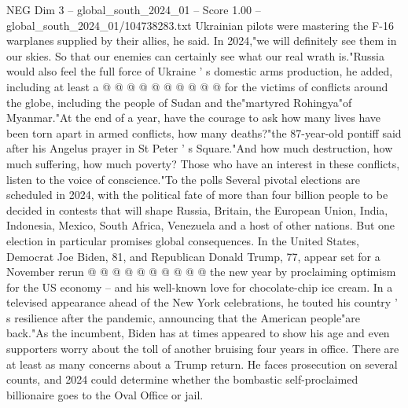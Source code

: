 \begin{textsample}{NEG Dim 3 – global\_south\_2024\_01 – Score 1.00 – global\_south\_2024\_01/104738283.txt}
Ukrainian pilots were mastering the F-16 warplanes supplied by their allies, he said.
In 2024,"we will definitely see them in our skies.
So that our enemies can certainly see what our real wrath is."Russia would also feel the full force of Ukraine ' s domestic arms production, he added, including at least a @ @ @ @ @ @ @ @ @ @ for the victims of conflicts around the globe, including the people of Sudan and the"martyred Rohingya"of Myanmar."At the end of a year, have the courage to ask how many lives have been torn apart in armed conflicts, how many deaths?"the 87-year-old pontiff said after his Angelus prayer in St Peter ' s Square."And how much destruction, how much suffering, how much poverty?
Those who have an interest in these conflicts, listen to the voice of conscience."To the polls Several pivotal elections are scheduled in 2024, with the political fate of more than four billion people to be decided in contests that will shape Russia, Britain, the European Union, India, Indonesia, Mexico, South Africa, Venezuela and a host of other nations.
But one election in particular promises global consequences.
In the United States, Democrat Joe Biden, 81, and Republican Donald Trump, 77, appear set for a November rerun @ @ @ @ @ @ @ @ @ @ the new year by proclaiming optimism for the US economy -- and his well-known love for chocolate-chip ice cream.
In a televised appearance ahead of the New York celebrations, he touted his country ' s resilience after the pandemic, announcing that the American people"are back."As the incumbent, Biden has at times appeared to show his age and even supporters worry about the toll of another bruising four years in office.
There are at least as many concerns about a Trump return.
He faces prosecution on several counts, and 2024 could determine whether the bombastic self-proclaimed billionaire goes to the Oval Office or jail.

\end{textsample}
